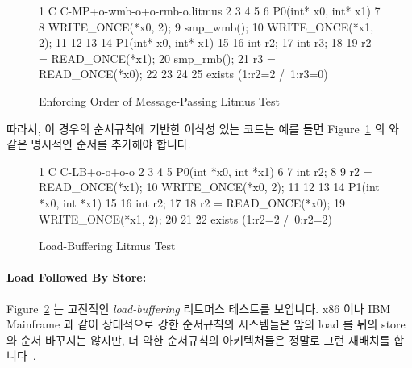 \begin{figure}[tbp]
{ \scriptsize
\begin{verbbox}
 1 C C-MP+o-wmb-o+o-rmb-o.litmus
 2
 3 {
 4 }
 5
 6 P0(int* x0, int* x1) {
 7
 8   WRITE_ONCE(*x0, 2);
 9   smp_wmb();
10   WRITE_ONCE(*x1, 2);
11
12 }
13
14 P1(int* x0, int* x1) {
15
16   int r2;
17   int r3;
18
19   r2 = READ_ONCE(*x1);
20   smp_rmb();
21   r3 = READ_ONCE(*x0);
22
23 }
24
25 exists (1:r2=2 /\ 1:r3=0)
\end{verbbox}
}
\centering
\theverbbox
\caption{Enforcing Order of Message-Passing Litmus Test}
\label{fig:advsync:Enforcing Order of Message-Passing Litmus Test}
\end{figure}

따라서, 이 경우의 순서규칙에 기반한 이식성 있는 코드는 예를 들면
Figure~\ref{fig:advsync:Enforcing Order of Message-Passing Litmus Test} 의
 와 같은 명시적인 순서를 추가해야 합니다.

\begin{figure}[tbp]
{ \scriptsize
\begin{verbbox}
 1 C C-LB+o-o+o-o
 2 {
 3 }
 4
 5 P0(int *x0, int *x1)
 6 {
 7   int r2;
 8
 9   r2 = READ_ONCE(*x1);
10   WRITE_ONCE(*x0, 2);
11 }
12
13
14 P1(int *x0, int *x1)
15 {
16   int r2;
17
18   r2 = READ_ONCE(*x0);
19   WRITE_ONCE(*x1, 2);
20 }
21
22 exists (1:r2=2 /\ 0:r2=2)
\end{verbbox}
}
\centering
\theverbbox
\caption{Load-Buffering Litmus Test}
\label{fig:advsync:Load-Buffering Litmus Test}
\end{figure}

\paragraph{Load Followed By Store:}
Figure~\ref{fig:advsync:Load-Buffering Litmus Test}
는 고전적인 \emph{load-buffering} 리트머스 테스트를 보입니다.
x86 이나 IBM Mainframe 과 같이 상대적으로 강한 순서규칙의 시스템들은 앞의 load
를 뒤의 store 와 순서 바꾸지는 않지만, 더 약한 순서규칙의 아키텍쳐들은 정말로
그런 재배치를 합니다~\cite{JadeAlglave2011ppcmem}.

